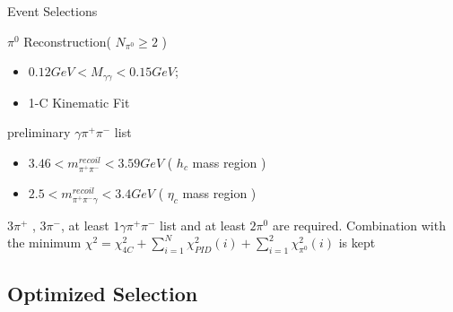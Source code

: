\documentclass{beamer}
\begin{document}
\begin{frame}{Event Selections}
    \begin{block}{$\pi^0$ Reconstruction( $N_{\pi^0}\geq 2$ )}
        \begin{itemize}
            \item $0.12GeV<M_{\gamma\gamma}<0.15GeV$;
                \item 1-C Kinematic Fit
        \end{itemize}
    \end{block}
    \begin{block}{preliminary $\gamma\pi^+\pi^-$ list}
        \begin{itemize}
            \item $3.46<m_{\pi^+\pi^-}^{recoil}<3.59 GeV$ ( $h_c$ mass region )
            \item $2.5<m_{\pi^+\pi^-\gamma}^{recoil}<3.4 GeV$ ( $\eta_c$ mass region )
        \end{itemize}
    \end{block}
    $3\pi^+$ , $3\pi^-$, at least $1 \gamma\pi^+\pi^-$ list and at least $2\pi^0$ are required.
    Combination with the minimum $\chi^2 = \chi^2_{4C} + \sum^N_{i=1}\chi^2_{PID}(i)+\sum^2_{i=1}\chi^2_{\pi^0}(i)$ is kept 
\end{frame}

\subsection{Optimized Selection}
\end{document}
